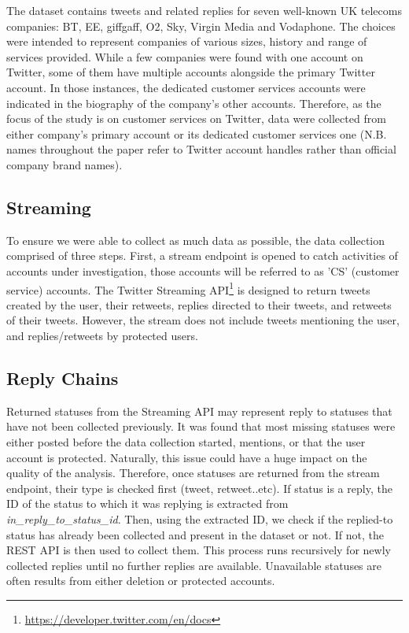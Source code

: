 \documentclass[sigconf]{acmart}
\begin{document}
The dataset contains tweets and related replies for seven well-known
UK telecoms companies: BT, EE, giffgaff, O2, Sky, Virgin Media and
Vodaphone.  The choices were intended to represent companies of
various sizes, history and range of services provided. While a few
companies were found with one account on Twitter, some of them have
multiple accounts alongside the primary Twitter account. In those
instances, the dedicated customer services accounts were indicated in
the biography of the company's other accounts. Therefore, as the focus
of the study is on customer services on Twitter, data were collected
from either company's primary account or its dedicated customer
services one (N.B. names throughout the paper refer to Twitter account
handles rather than official company brand names).

\subsection{Streaming}

To ensure we were able to collect as much data as possible, the data
collection comprised of three steps. First, a stream endpoint is
opened to catch activities of accounts under investigation, those
accounts will be referred to as 'CS' (customer service)
accounts. The Twitter Streaming
API\footnote{\url{https://developer.twitter.com/en/docs}} is designed
to return tweets created by the user, their retweets, replies directed
to their tweets, and retweets of their tweets. However, the stream
does not include tweets mentioning the user, and replies/retweets by
protected users.

\subsection{Reply Chains}

Returned statuses from the Streaming API may represent reply to
statuses that have not been collected previously. It was found that
most missing statuses were either posted before the data collection
started, mentions, or that the user account is protected. Naturally,
this issue could have a huge impact on the quality of the analysis. 
Therefore, once statuses are returned from the stream endpoint, 
their type is checked first (tweet, retweet..etc). If status is a reply, 
the ID of the status to which it was replying is extracted from 
{\emph{in\_reply\_to\_status\_id}}. Then, using the extracted ID, we 
check if the replied-to status has already been collected and present 
in the dataset or not. If not, the REST API is then used to collect 
them. This process runs recursively for newly collected replies until 
no further replies are available. Unavailable statuses are often 
results from either deletion or protected accounts.
\end{document}
